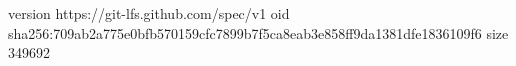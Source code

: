 version https://git-lfs.github.com/spec/v1
oid sha256:709ab2a775e0bfb570159cfc7899b7f5ca8eab3e858ff9da1381dfe1836109f6
size 349692
